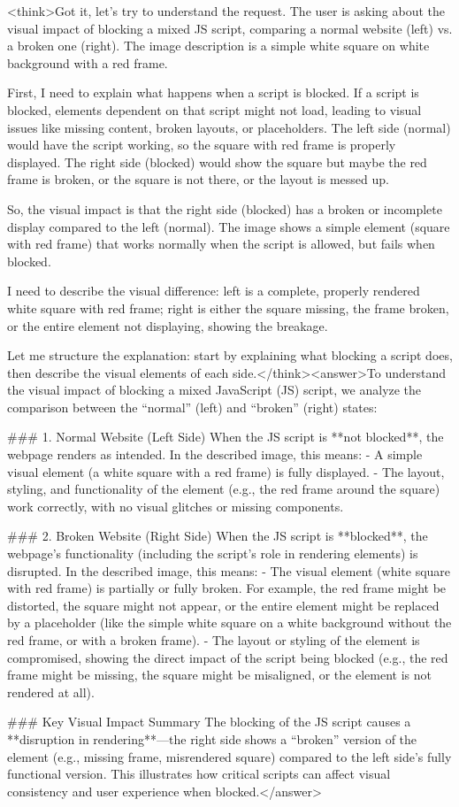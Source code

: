 <think>Got it, let's try to understand the request. The user is asking about the visual impact of blocking a mixed JS script, comparing a normal website (left) vs. a broken one (right). The image description is a simple white square on white background with a red frame. 

First, I need to explain what happens when a script is blocked. If a script is blocked, elements dependent on that script might not load, leading to visual issues like missing content, broken layouts, or placeholders. The left side (normal) would have the script working, so the square with red frame is properly displayed. The right side (blocked) would show the square but maybe the red frame is broken, or the square is not there, or the layout is messed up. 

So, the visual impact is that the right side (blocked) has a broken or incomplete display compared to the left (normal). The image shows a simple element (square with red frame) that works normally when the script is allowed, but fails when blocked. 

I need to describe the visual difference: left is a complete, properly rendered white square with red frame; right is either the square missing, the frame broken, or the entire element not displaying, showing the breakage. 

Let me structure the explanation: start by explaining what blocking a script does, then describe the visual elements of each side.</think><answer>To understand the visual impact of blocking a mixed JavaScript (JS) script, we analyze the comparison between the “normal” (left) and “broken” (right) states:  

### 1. Normal Website (Left Side)  
When the JS script is **not blocked**, the webpage renders as intended. In the described image, this means:  
- A simple visual element (a white square with a red frame) is fully displayed.  
- The layout, styling, and functionality of the element (e.g., the red frame around the square) work correctly, with no visual glitches or missing components.    

### 2. Broken Website (Right Side)  
When the JS script is **blocked**, the webpage’s functionality (including the script’s role in rendering elements) is disrupted. In the described image, this means:  
- The visual element (white square with red frame) is partially or fully broken. For example, the red frame might be distorted, the square might not appear, or the entire element might be replaced by a placeholder (like the simple white square on a white background without the red frame, or with a broken frame).  
- The layout or styling of the element is compromised, showing the direct impact of the script being blocked (e.g., the red frame might be missing, the square might be misaligned, or the element is not rendered at all).    

### Key Visual Impact Summary  
The blocking of the JS script causes a **disruption in rendering**—the right side shows a “broken” version of the element (e.g., missing frame, misrendered square) compared to the left side’s fully functional version. This illustrates how critical scripts can affect visual consistency and user experience when blocked.</answer>